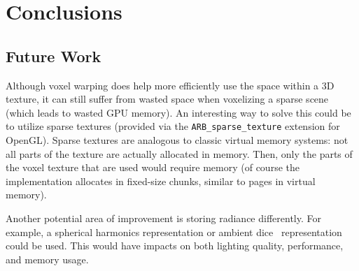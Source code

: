 \chapter{Conclusions}

\section{Future Work}
Although voxel warping does help more efficiently use the space within a 3D texture, it can still suffer from wasted space when voxelizing a sparse scene (which leads to wasted GPU memory). An interesting way to solve this could be to utilize sparse textures (provided via the \verb#ARB_sparse_texture# extension for OpenGL). Sparse textures are analogous to classic virtual memory systems: not all parts of the texture are actually allocated in memory. Then, only the parts of the voxel texture that are used would require memory (of course the implementation allocates in fixed-size chunks, similar to pages in virtual memory).

Another potential area of improvement is storing radiance differently. For example, a spherical harmonics representation or ambient dice~\cite{iwanicki2017ambient} representation could be used. This would have impacts on both lighting quality, performance, and memory usage.

